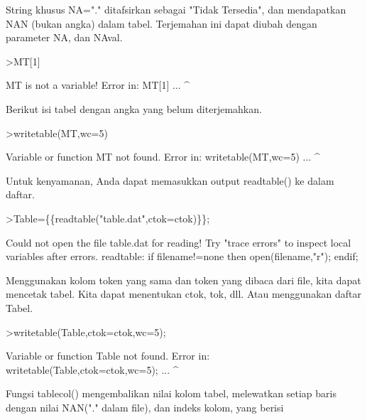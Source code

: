 \documentclass[a4paper,10pt]{article}
\begin{document}
\begin{eulernotebook}
\begin{eulercomment}
\begin{eulercomment}
\begin{eulercomment}
\begin{eulercomment}
\begin{eulercomment}
\begin{eulercomment}
\begin{eulercomment}
\begin{eulercomment}
\begin{eulercomment}
\begin{eulercomment}
\begin{eulercomment}
\begin{eulercomment}
\begin{eulercomment}
\begin{eulercomment}
\begin{eulercomment}
\begin{eulercomment}
\begin{eulercomment}
\begin{eulercomment}
\begin{eulercomment}
String khusus NA="." ditafsirkan sebagai "Tidak Tersedia", dan
mendapatkan NAN (bukan angka) dalam tabel. Terjemahan ini dapat diubah
dengan parameter NA, dan NAval.
\end{eulercomment}
\begin{eulerprompt}
>MT[1]
\end{eulerprompt}
\begin{euleroutput}
  MT is not a variable!
  Error in:
  MT[1] ...
       ^
\end{euleroutput}
\begin{eulercomment}
Berikut isi tabel dengan angka yang belum diterjemahkan.
\end{eulercomment}
\begin{eulerprompt}
>writetable(MT,wc=5)
\end{eulerprompt}
\begin{euleroutput}
  Variable or function MT not found.
  Error in:
  writetable(MT,wc=5) ...
               ^
\end{euleroutput}
\begin{eulercomment}
Untuk kenyamanan, Anda dapat memasukkan output readtable() ke dalam
daftar.
\end{eulercomment}
\begin{eulerprompt}
>Table=\{\{readtable("table.dat",ctok=ctok)\}\};
\end{eulerprompt}
\begin{euleroutput}
  Could not open the file
  table.dat
  for reading!
  Try "trace errors" to inspect local variables after errors.
  readtable:
      if filename!=none then open(filename,"r"); endif;
\end{euleroutput}
\begin{eulercomment}
Menggunakan kolom token yang sama dan token yang dibaca dari file,
kita dapat mencetak tabel. Kita dapat menentukan ctok, tok, dll. Atau
menggunakan daftar Tabel.
\end{eulercomment}
\begin{eulerprompt}
>writetable(Table,ctok=ctok,wc=5);
\end{eulerprompt}
\begin{euleroutput}
  Variable or function Table not found.
  Error in:
  writetable(Table,ctok=ctok,wc=5); ...
                  ^
\end{euleroutput}
\begin{eulercomment}
Fungsi tablecol() mengembalikan nilai kolom tabel, melewatkan setiap
baris dengan nilai NAN("." dalam file), dan indeks kolom, yang berisi

\end{eulercomment}
\end{eulercomment}
\end{eulercomment}
\end{eulercomment}
\end{eulercomment}
\end{eulercomment}
\end{eulercomment}
\end{eulercomment}
\end{eulercomment}
\end{eulercomment}
\end{eulercomment}
\end{eulercomment}
\end{eulercomment}
\end{eulercomment}
\end{eulercomment}
\end{eulercomment}
\end{eulercomment}
\end{eulercomment}
\end{eulercomment}
\end{eulernotebook}
\end{document}
